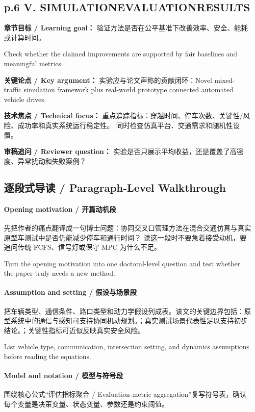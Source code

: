 \documentclass[UTF8,a4paper,11pt,fontset=fandol]{ctexart}
\begin{document}
\subsection*{p.6 V. SIMULATIONEVALUATIONRESULTS}
\textbf{章节目标 / Learning goal：} 验证方法是否在公平基准下改善效率、安全、能耗或计算时间。

Check whether the claimed improvements are supported by fair baselines and meaningful metrics.

\textbf{关键论点 / Key argument：} 实验应与论文声称的贡献闭环：Novel mixed-traffic simulation framework plus real-world prototype connected automated vehicle drives.

\textbf{技术焦点 / Technical focus：} 重点追踪指标：穿越时间、停车次数、关键性/风险、成功率和真实系统运行稳定性。 同时检查仿真平台、交通需求和随机性设置。

\textbf{审稿追问 / Reviewer question：} 实验是否只展示平均收益，还是覆盖了高密度、异常扰动和失败案例？


\subsection{逐段式导读 / Paragraph-Level Walkthrough}
\paragraph{Opening motivation / 开篇动机段}先把作者的痛点翻译成一句博士问题：协同交叉口管理方法在混合交通仿真与真实原型车测试中是否仍能减少停车和通行时间？ 读这一段时不要急着接受动机，要追问传统 FCFS、信号灯或保守 MPC 为什么不足。

Turn the opening motivation into one doctoral-level question and test whether the paper truly needs a new method.

\paragraph{Assumption and setting / 假设与场景段}把车辆类型、通信条件、路口类型和动力学假设列成表。该文的关键边界包括：原型系统中的通信与感知可支持协同机动规划。；真实测试场景代表性足以支持初步结论。；关键性指标可近似反映真实安全风险。

List vehicle type, communication, intersection setting, and dynamics assumptions before reading the equations.

\paragraph{Model and notation / 模型与符号段}围绕核心公式“评估指标聚合 / Evaluation-metric aggregation”复写符号表，确认每个变量是决策变量、状态变量、参数还是约束阈值。
\end{document}
